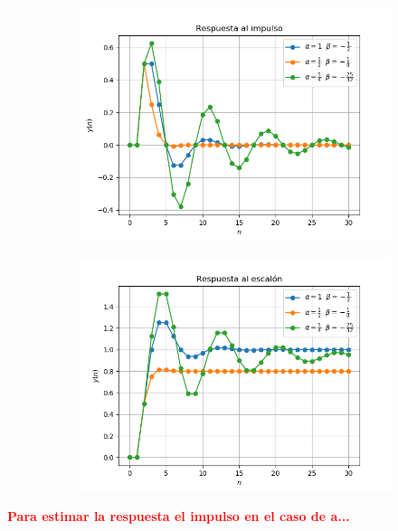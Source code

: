 \begin{figure}[H]
\centering
\begin{subfigure}{.49\textwidth}
\centering
	\includegraphics[width=\textwidth]{Imagenes/9-impulso.png}
\end{subfigure}
\begin{subfigure}{.49\textwidth}
\centering
	\includegraphics[width=\textwidth]{Imagenes/9-escalon.png}
\end{subfigure}
\end{figure}

\begin{center}
	\textcolor{red}{\textbf{Para estimar la respuesta el impulso en el caso de a...}}
\end{center}

